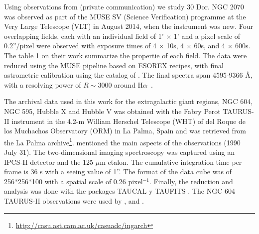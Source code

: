 \documentclass[fleqn,usenatbib, useAMS, a4paper]{mnras}
\newcommand\halpha{H${\alpha}$}
\begin{document}
Using observations from \citet{Castro:2018a} (private communication) we study 30 Dor.
NGC 2070 was observed as part of the MUSE SV (Science Verification) programme at the Very Large Telescope (VLT) in August 2014, when the instrument was new. 
Four overlapping fields, each with an individual field of 1' \(\times\) 1' and a pixel scale of 0.2''/pixel were observed with exposure times of 4 \(\times\) 10s, 4 \(\times\) 60s, and 4 \(\times\) 600s. 
The table 1 on their work summarize the propertie of each field.
The data were reduced using the MUSE pipeline based on ESOREX recipes, with final astrometric calibration using the catalog of \citet{1999A&A...341...98S}. 
The final spectra span 4595-9366 \AA, with a resolving power of \(R \sim3 000\) around \halpha\  \citep{Castro:2018a}.

The archival data used in this work for the extragalactic giant regions, NGC 604, NGC 595, Hubble X and Hubble V was obtained with the Fabry Perot TAURUS-II instrument in the 4.2-m William Herschel Telescope (WHT) of del Roque de los Muchachos Observatory (ORM) in La Palma, Spain and was retrieved from the La Palma archive\footnote{\url{http://casu.ast.cam.ac.uk/casuadc/ingarch}}.
\citet{sabalisck1995supersonic} mentioned the main aspects of the observations (1990 July 31).
The two-dimensional imaging spectroscopy was captured using an IPCS-II detector and the 125 $\mu$m etalon.
The cumulative integration time per frame is 36 s with a seeing value of 1''.
The format of the data cube was of 256*256*100 with a spatial scale of 0.26 pixel$^{-1}$.
Finally, the reduction and analysis was done with the packages TAUCAL y TAUFITS \citep{1992ASPC...25..445L}. The NGC 604 TAURUS-II observations were used by \citet{sabalisck1995supersonic}, \citet{tanco1997} and \citet{2019arXiv191203543M}.
\end{document}
